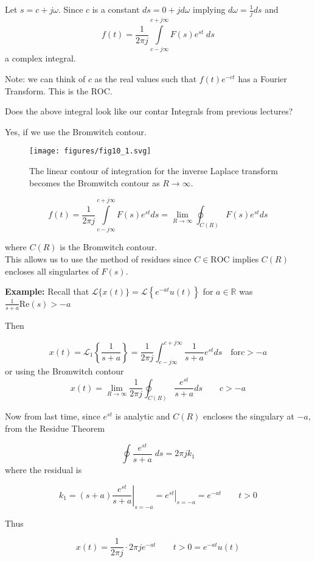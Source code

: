 \documentclass{article}
\begin{document}
Let $s=c+j \omega$. Since $c$ is a constant $ds = 0+j d\omega$ implying $d \omega=\frac{1}{j} d s$
and
$$
f(t)=\frac{1}{2 \pi j} \int\limits_{c-j\infty}^{c+j\infty} F(s) e^{st}\; ds
$$
a complex integral.

Note: we can think of $c$ as the real values such that $f(t) e^{-c t}$ has a Fourier Transform. This is the ROC.

Does the above integral look like our contar Integrals from previous lectures?

Yes, if we use the Bromwitch contour.

\begin{figure}
  \centering
  \texttt{[image: figures/fig10\_1.svg]}
  \caption{The linear contour of integration for the inverse Laplace transform becomes the Bromwitch contour as $R\rightarrow\infty$.}
\end{figure}

$$
f(t)=\frac{1}{2 \pi j} \int\limits_{c-j \infty}^{c+j \infty} F(s) e^{s t} d s = \lim_{R \rightarrow \infty} \oint_{C(R)} F(s) e^{s t} ds
$$

where $C(R)$ is the Bromwitch contour.\\


This allows us to use the method of residues since $C \in \text{ROC}$ implies $C(R)$ encloses all singulartes of $F(s)$.

\textbf{Example:} Recall that $\mathcal{L}\{x(t)\}=\mathcal{L}\left\{e^{-a t} u(t)\right\}$ for $a\in \mathbb{R}$ was $\frac{1}{s+a} \text{Re}(s) > -a$

Then

$$
x(t)=\mathcal{L}_1 \left\{\frac{1}{s+a}\right\}=\frac{1}{2 \pi j} \int_{c-j \infty}^{c+ j\infty} \frac{1}{s+a} e^{s t} d s \quad \text{for} c > -a
$$
or using the Bromwitch contour
$$
x(t) =\lim_{R \rightarrow \infty} \frac{1}{2 \pi j} \oint_{C(R)} \frac{e^{s t}}{s+a} ds  \qquad c>-a
$$

Now from last time, since $e^{s t}$ is analytic and $C(R)$ encloses the singulary at $-a$, from the Residue Theorem

$$
\oint \frac{e^{st}}{s+a}\; ds = 2\pi j k_1
$$
where the residual is

$$
k_1 = \left. (s+a) \frac{e^{st}}{s+a} \right|_{s = -a} = \left. e^{st} \right|_{s = -a} = e^{-a t} \qquad t > 0  
$$

Thus

$$
x(t) = \frac{1}{2\pi j} \cdot 2\pi j e^{-at} \qquad t > 0 = e^{-at}u(t)
$$
\end{document}
